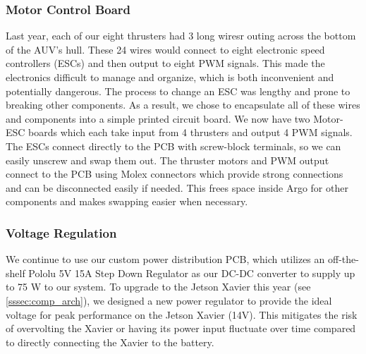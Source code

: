 \documentclass[conference]{IEEEtran}
\begin{document}
\subsubsection{Motor Control Board}
\label{sssec:motor_board}
Last year, each of our eight thrusters had 3 long wiresr outing across the bottom of the AUV's hull. These 24 wires would connect to eight electronic speed controllers (ESCs) and then output to eight PWM signals. This made the electronics difficult to manage and organize, which is both inconvenient and potentially dangerous. The process to change an ESC was lengthy and prone to breaking other components. As a result, we chose to encapsulate all of these wires and components into a simple printed circuit board. We now have two Motor-ESC boards which each take input from 4 thrusters and output 4 PWM signals. The ESCs connect directly to the PCB with screw-block terminals, so we can easily unscrew and swap them out. The thruster motors and PWM output connect to the PCB using Molex connectors which provide strong connections and can be disconnected easily if needed. This frees space inside Argo for other components and makes swapping easier when necessary.

\subsubsection{Voltage Regulation}
\label{sssec:voltage_regulation}
We continue to use our custom power distribution PCB, which utilizes an off-the-shelf Pololu 5V 15A Step Down Regulator as our DC-DC converter to supply up to 75 W to our system. To upgrade to the Jetson Xavier this year (see \ref{sssec:comp_arch}), we designed a new power regulator to provide the ideal voltage for peak performance on the Jetson Xavier (14V). This mitigates the risk of overvolting the Xavier or having its power input fluctuate over time compared to directly connecting the Xavier to the battery.

\end{document}
